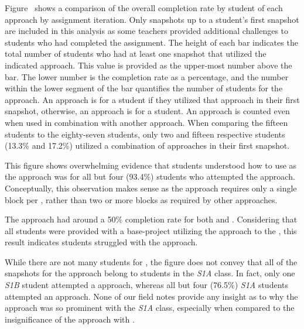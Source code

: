 Figure~ shows a comparison of the
overall completion rate by student of each approach by assignment
iteration. Only snapshots up to a student's first \com{} snapshot are included
in this analysis as some teachers provided additional challenges to students
who had completed the assignment. The height of each bar indicates the total
number of students who had at least one snapshot that utilized the indicated
approach. This value is provided as the upper-most number above the bar. The
lower number is the completion rate as a percentage, and the number within the
lower segment of the bar quantifies the number of \com{} students for the
approach. An approach is \com{} for a student if they utilized that approach in
their first \com{} snapshot, otherwise, an approach is \incom{} for a
student. An approach is counted even when used in combination with another
approach. When comparing the fifteen \sone{} \com{} students to the
eighty-seven \stwo{} \com{} students, only two and fifteen respective \com{}
students (13.3\% and 17.2\%) utilized a combination of approaches in their
first \com{} snapshot.

This figure shows overwhelming evidence that students understood how to use
\glideto{} as the approach was \com{} for all but four (93.4\%) students who
attempted the approach. Conceptually, this observation makes sense as the
approach requires only a single block per \catch{}, rather than two or more
blocks as required by other approaches.

The \abs{} approach had around a 50\% completion rate for both \sone{} and
\stwo{}. Considering that all students were provided with a base-project
utilizing the \abs{} approach to \catch{} the \zebra{}, this result indicates
students struggled with the \abs{} approach.

While there are not many students for \sone{}, the figure does not convey that
all of the \com{} snapshots for the \rel{} approach belong to students in the
\emph{S1A} class. In fact, only one \emph{S1B} student attempted a \rel{}
approach, whereas all but four (76.5\%) \emph{S1A} students attempted an \abs{}
approach. None of our field notes provide any insight as to why the \rel{}
approach was so prominent with the \emph{S1A} class, especially when compared
to the insignificance of the \rel{} approach with \stwo{}.

